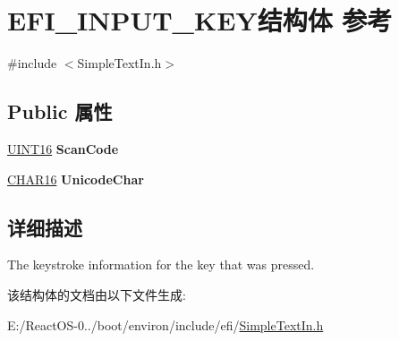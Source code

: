\hypertarget{struct_e_f_i___i_n_p_u_t___k_e_y}{}\section{E\+F\+I\+\_\+\+I\+N\+P\+U\+T\+\_\+\+K\+E\+Y结构体 参考}
\label{struct_e_f_i___i_n_p_u_t___k_e_y}


{\ttfamily \#include $<$Simple\+Text\+In.\+h$>$}

\subsection*{Public 属性}
\begin{DoxyCompactItemize}
\item 
\mbox{\label{struct_e_f_i___i_n_p_u_t___k_e_y_a519ee07cba9dd7c65cab49d7fb6bfd4f}} 
\hyperlink{_processor_bind_8h_a09f1a1fb2293e33483cc8d44aefb1eb1}{U\+I\+N\+T16} {\bfseries Scan\+Code}
\item 
\mbox{\label{struct_e_f_i___i_n_p_u_t___k_e_y_ac8469ccf86ce42a5e7f72c319d1ea3c7}} 
\hyperlink{_processor_bind_8h_a7ae886893bd2a2ae253eb2b021a48724}{C\+H\+A\+R16} {\bfseries Unicode\+Char}
\end{DoxyCompactItemize}


\subsection{详细描述}
The keystroke information for the key that was pressed. 

该结构体的文档由以下文件生成\+:\begin{DoxyCompactItemize}
\item 
E\+:/\+React\+O\+S-\/0../boot/environ/include/efi/\hyperlink{_simple_text_in_8h}{Simple\+Text\+In.\+h}\end{DoxyCompactItemize}
